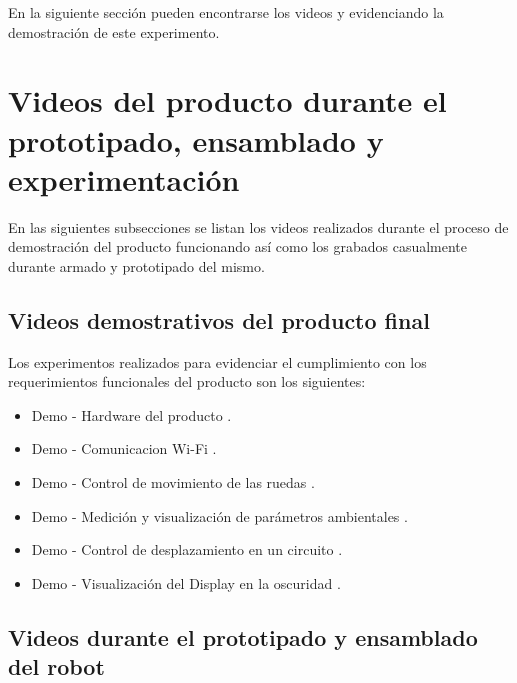 En la siguiente sección pueden encontrarse los videos \cite{Demo_Control_Movimiento_1} y \cite{Demo_Control_Movimiento_2} evidenciando la demostración de este experimento.



\section{Videos del producto durante el prototipado, ensamblado y experimentación}

En las siguientes subsecciones se listan los videos realizados durante el proceso de demostración del producto funcionando así como los grabados casualmente durante armado y prototipado del mismo.


\subsection{Videos demostrativos del producto final}

Los experimentos realizados para evidenciar el cumplimiento con los requerimientos funcionales del producto son los siguientes:
\begin{itemize}
	\item Demo - Hardware del producto \cite{Demo_Hardware}.
	\item Demo - Comunicacion Wi-Fi \cite{Demo_ComWifi}.
	\item Demo - Control de movimiento de las ruedas \cite{Demo_Control_Movimiento_1}.
	\item Demo - Medición y visualización de parámetros ambientales \cite{Demo_Mediciones}.
	\item Demo - Control de desplazamiento en un circuito \cite{Demo_Control_Movimiento_2}.
	\item Demo - Visualización del Display en la oscuridad \cite{Demo_Display_Oscuridad}.
	
\end{itemize}


\subsection{Videos durante el prototipado y ensamblado del robot}

